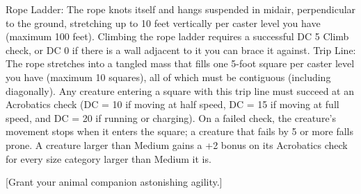 {Rope Ladder: The rope knots itself and hangs suspended in midair, perpendicular to the ground, stretching up to 10 feet vertically per caster level you have (maximum 100 feet). Climbing the rope ladder requires a successful DC 5 Climb check, or DC 0 if there is a wall adjacent to it you can brace it against.
Trip Line: The rope stretches into a tangled mass that fills one 5-foot square per caster level you have (maximum 10 squares), all of which must be contiguous (including diagonally). Any creature entering a square with this trip line must succeed at an Acrobatics check (DC = 10 if moving at half speed, DC = 15 if moving at full speed, and DC = 20 if running or charging). On a failed check, the creature's movement stops when it enters the square; a creature that fails by 5 or more falls prone. A creature larger than Medium gains a +2 bonus on its Acrobatics check for every size category larger than Medium it is.}
        
[Grant your animal companion astonishing agility.]
        
